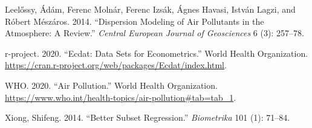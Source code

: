 \documentclass[
]{article}
\begin{document}
\leavevmode\hypertarget{ref-leelHossy2014dispersion}{}%
Leelőssy, Ádám, Ferenc Molnár, Ferenc Izsák, Ágnes Havasi, István Lagzi,
and Róbert Mészáros. 2014. ``Dispersion Modeling of Air Pollutants in
the Atmosphere: A Review.'' \emph{Central European Journal of
Geosciences} 6 (3): 257--78.

\leavevmode\hypertarget{ref-RstudioData}{}%
r-project. 2020. ``Ecdat: Data Sets for Econometrics.'' World Health
Organization.
\url{https://cran.r-project.org/web/packages/Ecdat/index.html}.

\leavevmode\hypertarget{ref-WHOestimation}{}%
WHO. 2020. ``Air Pollution.'' World Health Organization.
\url{https://www.who.int/health-topics/air-pollution\#tab=tab_1}.

\leavevmode\hypertarget{ref-xiong2014better}{}%
Xiong, Shifeng. 2014. ``Better Subset Regression.'' \emph{Biometrika}
101 (1): 71--84.
\end{document}
